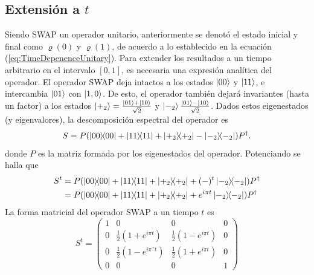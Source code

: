 \subsection{Extensión a $t$}
Siendo \textsc{SWAP} un operador unitario, anteriormente se denotó el estado inicial y final como $\varrho(0)$ y $\varrho(1)$, de acuerdo a lo establecido en la ecuación (\ref{eq:TimeDepenenceUnitary}). Para extender los resultados a un tiempo arbitrario en el intervalo $[0,1]$, es necesaria una expresión analítica del operador. El operador SWAP deja intactos a los estados $\ket{00}$ y $\ket{11}$, e intercambia $\ket{01}$ con $\ket{1,0}$. De esto, el operador también dejará invariantes (hasta un factor) a los estados $\ket{+_{2}}=\frac{\ket{01}+\ket{10}}{\sqrt{2}}$ y $\ket{-_{2}}\frac{\ket{01}-\ket{10}}{\sqrt{2}}$. Dados estos eigenestados (y eigenvalores), la descomposición espectral del operador es
\begin{equation}\label{eq:SWAPSpectral}
S=P(\dyad{00}+\dyad{11}+\dyad{+_{2}}-\dyad{-_{2}})P^{\dag}.
\end{equation}
donde $P$ es la matriz formada por los eigenestados del operador. Potenciando se halla que
\begin{align}\label{eq:SWAPPower}
S^{t}&=P(\dyad{00}+\dyad{11}+\dyad{+_{2}}+(-)^{t}\dyad{-_{2}})P^{\dag}\\
&=P(\dyad{00}+\dyad{11}+\dyad{+_{2}}+e^{i \pi t}\dyad{-_{2}})P^{\dag}
\end{align}
La forma matricial del operador \textsc{SWAP} a un tiempo $t$ es
\begin{equation}
S^{t}=\begin{pmatrix}
 1 & 0 & 0 & 0 \\
 0 & \frac{1}{2}(1+e^{i \pi t}) & \frac{1}{2} (1-e^{i \pi t}) & 0 \\
 0 & \frac{1}{2}(1-e^{i \pi ´t}) & \frac{1}{2}(1+e^{i \pi t}) & 0 \\
 0 & 0 & 0 & 1
\end{pmatrix}
\end{equation}
